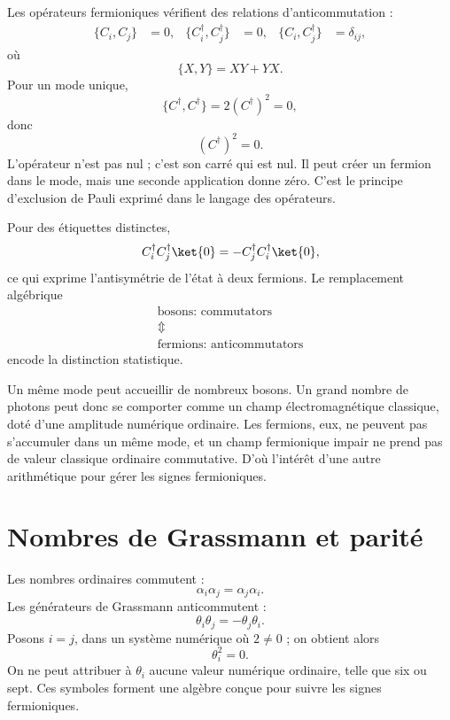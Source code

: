 Les opérateurs fermioniques vérifient des relations d’anticommutation :
\begin{align}
\{C_i,C_j\}&=0,&
\{C_i^\dagger,C_j^\dagger\}&=0,&
\{C_i,C_j^\dagger\}&=\delta_{ij},
\end{align}
où
\begin{equation}
\{X,Y\}=XY+YX.
\end{equation}
Pour un mode unique,
\begin{equation}
\{C^\dagger,C^\dagger\}=2(C^\dagger)^2=0,
\end{equation}
donc
\begin{equation}
(C^\dagger)^2=0.
\end{equation}
L’opérateur n’est pas nul ; c’est son carré qui est nul. Il peut créer un fermion dans le mode, mais une seconde application donne zéro. C’est le principe d’exclusion de Pauli exprimé dans le langage des opérateurs.

Pour des étiquettes distinctes,
\begin{equation}
C_i^\dagger C_j^\dagger\ket{0}
=-C_j^\dagger C_i^\dagger\ket{0},
\end{equation}
ce qui exprime l’antisymétrie de l’état à deux fermions. Le remplacement algébrique
\begin{equation}
\begin{gathered}
\text{bosons: commutators}\\
\Updownarrow\\
\text{fermions: anticommutators}
\end{gathered}
\end{equation}
encode la distinction statistique.

Un même mode peut accueillir de nombreux bosons. Un grand nombre de photons peut donc se comporter comme un champ électromagnétique classique, doté d’une amplitude numérique ordinaire. Les fermions, eux, ne peuvent pas s’accumuler dans un même mode, et un champ fermionique impair ne prend pas de valeur classique ordinaire commutative. D’où l’intérêt d’une autre arithmétique pour gérer les signes fermioniques.

\section{Nombres de Grassmann et parité}

Les nombres ordinaires commutent :
\begin{equation}
\alpha_i\alpha_j=\alpha_j\alpha_i.
\end{equation}
Les générateurs de Grassmann anticommutent :
\begin{equation}
\theta_i\theta_j=-\theta_j\theta_i.
\end{equation}
Posons \(i=j\), dans un système numérique où \(2\neq0\) ; on obtient alors
\begin{equation}
\theta_i^2=0.
\end{equation}
On ne peut attribuer à \(\theta_i\) aucune valeur numérique ordinaire, telle que six ou sept. Ces symboles forment une algèbre conçue pour suivre les signes fermioniques.

